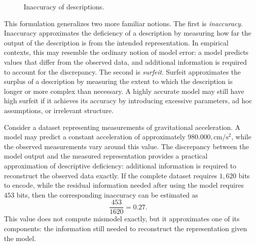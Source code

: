 \begin{figure}[t]
\centering
{}
\caption{\label{fig:inaccuracy:inaccuracy:inaccuracy}Inaccuracy of descriptions.}
\end{figure}

This formulation generalizes two more familiar notions. The first is \emph{inaccuracy}. Inaccuracy approximates the deficiency of a description by measuring how far the output of the description is from the intended representation. In empirical contexts, this may resemble the ordinary notion of model error: a model predicts values that differ from the observed data, and additional information is required to account for the discrepancy. The second is \emph{surfeit}. Surfeit approximates the surplus of a description by measuring the extent to which the description is longer or more complex than necessary. A highly accurate model may still have high surfeit if it achieves its accuracy by introducing excessive parameters, ad hoc assumptions, or irrelevant structure.

\begin{example}
\label{ex:introduction:mismodel:newton}
Consider a dataset representing measurements of gravitational acceleration. A model may predict a constant acceleration of approximately $980.000,\mathrm{cm/s^2}$, while the observed measurements vary around this value. The discrepancy between the model output and the measured representation provides a practical approximation of descriptive deficiency: additional information is required to reconstruct the observed data exactly. If the complete dataset requires $1,620$ bits to encode, while the residual information needed after using the model requires $453$ bits, then the corresponding inaccuracy can be estimated as
\[
\frac{453}{1620}=0.27.
\]
This value does not compute mismodel exactly, but it approximates one of its components: the information still needed to reconstruct the representation given the model.
\end{example}

